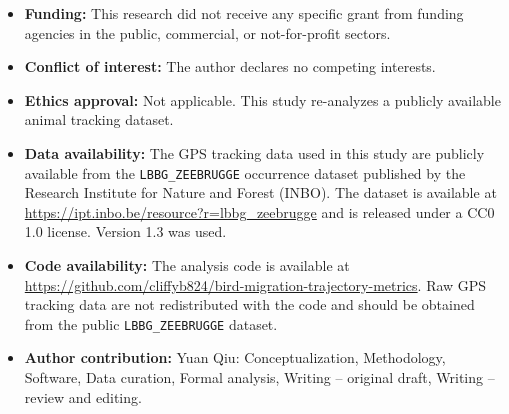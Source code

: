 \documentclass[pdflatex,sn-vancouver-num]{sn-jnl}
\begin{document}
\begin{itemize}
\item \textbf{Funding:} This research did not receive any specific grant from funding agencies in the public, commercial, or not-for-profit sectors.
\item \textbf{Conflict of interest:} The author declares no competing interests.
\item \textbf{Ethics approval:} Not applicable. This study re-analyzes a publicly available animal tracking dataset.
\item \textbf{Data availability:} The GPS tracking data used in this study are publicly available from the \texttt{LBBG\_ZEEBRUGGE} occurrence dataset published by the Research Institute for Nature and Forest (INBO). The dataset is available at \url{https://ipt.inbo.be/resource?r=lbbg_zeebrugge} and is released under a CC0 1.0 license. Version 1.3 was used.
\item \textbf{Code availability:} The analysis code is available at \url{https://github.com/cliffyb824/bird-migration-trajectory-metrics}. Raw GPS tracking data are not redistributed with the code and should be obtained from the public \texttt{LBBG\_ZEEBRUGGE} dataset.
\item \textbf{Author contribution:} Yuan Qiu: Conceptualization, Methodology, Software, Data curation, Formal analysis, Writing -- original draft, Writing -- review and editing.
\end{itemize}


\end{document}
